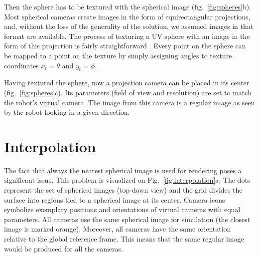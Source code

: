 \documentclass{svproc}
\begin{document}
Then the sphere has to be textured with the spherical image (fig.~\ref{fig:spheres}b).
Most spherical cameras create images in the form of equirectangular projections, and, without the loss
of the generality of the solution, we assumed images in that format are available.
The process of texturing a UV sphere with an image in the form of this projection is fairly straightforward \cite{greene1986environment}. 
Every point on the sphere can be mapped to a point on the texture by simply assigning angles to texture 
coordinates $x_t = \theta$ and $y_t = \phi$.

Having textured the sphere, now a projection camera can be placed in its center (fig.~\ref{fig:spheres}c).
Its parameters (field of view and resolution) are set to match the robot's virtual camera.
The image from this camera is a regular image as seen by the robot looking in a given direction.

\section{Interpolation}
\label{sec:iterpolate}


The fact that always the nearest spherical image is used for rendering poses a significant issue.
This problem is visualized on Fig.~\ref{fig:interpolation}a.
The dots represent the set of spherical images (top-down view) and the grid divides the surface into regions tied to a spherical image at its center.
Camera icons symbolize exemplary positions and orientations of virtual cameras with equal parameters.
All cameras use the same spherical image for simulation (the closest image is marked orange).
Moreover, all cameras have the same orientation relative to the global reference frame.
This means that the same regular image would be produced for all the cameras.
\end{document}
